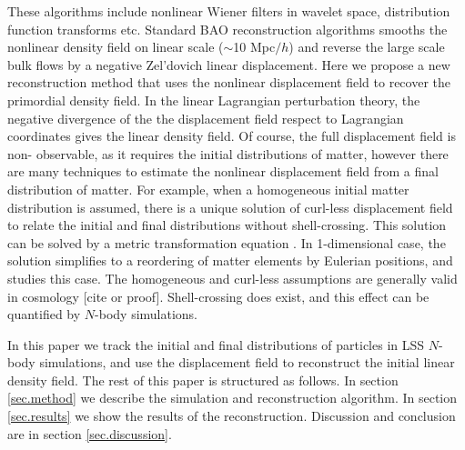 \documentclass[aps,prd,twocolumn,superscriptaddress,amsfont,amssymb,amsmath,nofootinbib,showpacs,balancelastpage]{revtex4-1}
\begin{document}
These algorithms include nonlinear Wiener filters in wavelet space, distribution 
function transforms etc. Standard BAO reconstruction algorithms smooths the 
nonlinear density field on linear scale ($\sim$10 Mpc$/h$) and reverse the large 
scale bulk flows by a negative Zel'dovich linear displacement. Here we propose a 
new reconstruction method that uses the nonlinear displacement field to recover the 
primordial density field. In the linear Lagrangian perturbation theory, the 
negative divergence of the the displacement field respect to Lagrangian coordinates 
gives the linear density field. Of course, the full displacement field is non-
observable, as it requires the initial distributions of matter, however there are 
many techniques to estimate the nonlinear displacement field from a final 
distribution of matter. For example, when a homogeneous initial matter distribution 
is assumed, there is a unique solution of curl-less displacement field to relate 
the initial and final distributions without shell-crossing. This solution can be 
solved by a metric transformation equation \citep{1995ApJS..100..269P,1998ApJS..
115...19P}. In 1-dimensional case, the solution simplifies to a reordering of 
matter elements by Eulerian positions, and \cite{2016arXiv160907041Z} studies this 
case. The homogeneous and curl-less assumptions are generally valid in cosmology 
[cite or proof]. Shell-crossing does exist, and this effect can be quantified by 
$N$-body simulations.

In this paper we track the initial and final distributions of particles in LSS $N$-
body simulations, and use the displacement field to reconstruct the initial linear 
density field. The rest of this paper is structured as follows. In section 
\ref{sec.method} we describe the simulation and reconstruction algorithm. In 
section \ref{sec.results} we show the results of the reconstruction. Discussion and 
conclusion are in section \ref{sec.discussion}.
\end{document}
